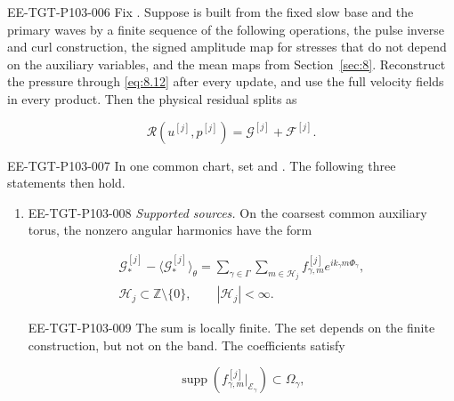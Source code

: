 \begin{proposition}\label{prop:9.3}
\begin{EESegment}{EE-TGT-P103-006}
Fix . Suppose
 is built from the fixed slow base and the primary waves by
a finite sequence of the following operations, the pulse inverse and curl construction, the signed
amplitude map for stresses that do not depend on the auxiliary variables, and the mean maps from
Section~\ref{sec:8}. Reconstruct the pressure through \eqref{eq:8.12} after every update, and use
the full velocity fields in every product. Then the physical residual splits as
\end{EESegment}
\begin{equation}
\mathscr R(u^{[j]},p^{[j]})=\mathcal G^{[j]}+\mathcal F^{[j]}.
\tag{9.3}\label{eq:9.3}
\end{equation}
\begin{EESegment}{EE-TGT-P103-007}
In one common chart, set
 and
. The following three
statements then hold.
\end{EESegment}
\begin{enumerate}[label=(\roman*)]
\item \begin{EESegment}{EE-TGT-P103-008}
\emph{Supported sources.} On the coarsest common auxiliary torus, the nonzero angular harmonics
have the form
\end{EESegment}
\begin{equation}
\begin{gathered}
\mathcal G_*^{[j]}-\langle\mathcal G_*^{[j]}\rangle_\theta
 =\sum_{\gamma\in\Gamma}\sum_{m\in\mathscr H_j}
 f_{\gamma,m}^{[j]}e^{ik_\gamma m\Phi_\gamma},\\
\mathscr H_j\subset\mathbb Z\setminus\{0\},\qquad |\mathscr H_j|<\infty.
\end{gathered}
\tag{9.4}\label{eq:9.4}
\end{equation}
\begin{EESegment}{EE-TGT-P103-009}
The sum is locally finite. The set
 depends on the finite construction, but not on the band. The
coefficients satisfy
\end{EESegment}
\[
\operatorname{supp}(f_{\gamma,m}^{[j]}|_{\mathcal E_\gamma})\subset\Omega_\gamma,
\]
\end{enumerate}
\end{proposition}
